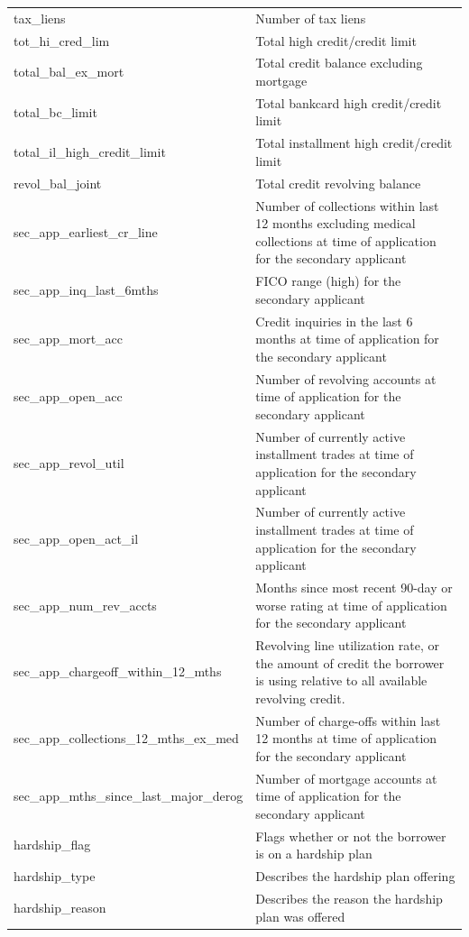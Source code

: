 \documentclass[11pt,]{report}
\begin{document}
\begin{longtable}[t]{>{\raggedright\arraybackslash}p{7cm}>{\raggedright\arraybackslash}p{7cm}}
tax\_liens & Number of tax liens\\
\addlinespace
tot\_hi\_cred\_lim & Total high credit/credit limit\\
total\_bal\_ex\_mort & Total credit balance excluding mortgage\\
total\_bc\_limit & Total bankcard high credit/credit limit\\
total\_il\_high\_credit\_limit & Total installment high credit/credit limit\\
revol\_bal\_joint & Total credit revolving balance\\
\addlinespace
sec\_app\_earliest\_cr\_line & Number of collections within last 12 months excluding medical collections at time of application for the secondary applicant\\
sec\_app\_inq\_last\_6mths & FICO range (high) for the secondary applicant\\
sec\_app\_mort\_acc & Credit inquiries in the last 6 months at time of application for the secondary applicant\\
sec\_app\_open\_acc & Number of revolving accounts at time of application for the secondary applicant\\
sec\_app\_revol\_util & Number of currently active installment trades at time of application for the secondary applicant\\
\addlinespace
sec\_app\_open\_act\_il & Number of currently active installment trades at time of application for the secondary applicant\\
sec\_app\_num\_rev\_accts & Months since most recent 90-day or worse rating at time of application for the secondary applicant\\
sec\_app\_chargeoff\_within\_12\_mths & Revolving line utilization rate, or the amount of credit the borrower is using relative to all available revolving credit.\\
sec\_app\_collections\_12\_mths\_ex\_med & Number of charge-offs within last 12 months at time of application for the secondary applicant\\
sec\_app\_mths\_since\_last\_major\_derog & Number of mortgage accounts at time of application for the secondary applicant\\
\addlinespace
hardship\_flag & Flags whether or not the borrower is on a hardship plan\\
hardship\_type & Describes the hardship plan offering\\
hardship\_reason & Describes the reason the hardship plan was offered\\

\end{longtable}
\end{document}
